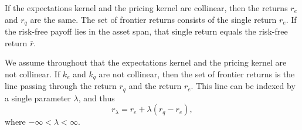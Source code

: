 \documentclass[\topdir/lecture\_notes.tex]{subfiles}
\begin{document}
If the expectations kernel and the pricing kernel are collinear, then the returns \(r_{e}\) and \(r_{q}\) are the same. The set of frontier returns consists of the single return \(r_{e}\). If the risk-free payoff lies in the asset span, that single return equals the risk-free return \(\bar{r}\).

We assume throughout that the expectations kernel and the pricing kernel are not collinear. If \(k_{e}\) and \(k_{q}\) are not collinear, then the set of frontier returns is the line passing through the return \(r_{q}\) and the return \(r_{e}\). This line can be indexed by a single parameter \(\lambda\), and thus
\begin{equation*}
r_{\lambda}=r_{e}+\lambda\left(r_{q}-r_{e}\right), \label{eq:frontier_return_parametrization} 
\end{equation*}
where \(-\infty<\lambda<\infty\).

\end{document}
